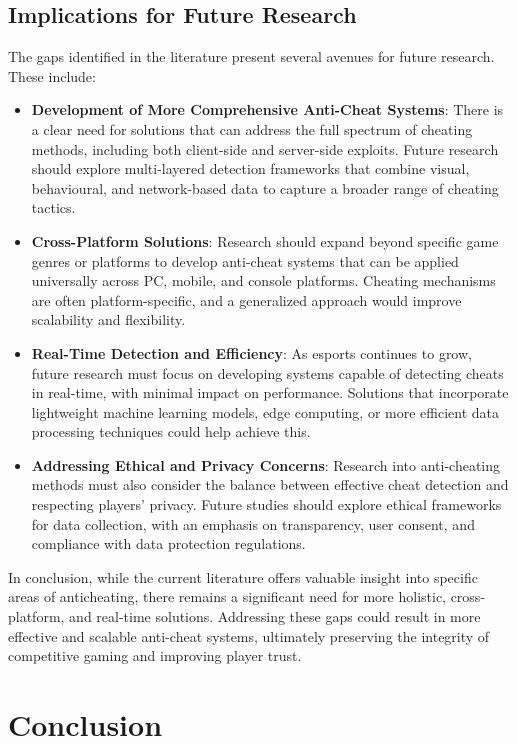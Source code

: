 \documentclass[a4paper, 12pt]{article}
\begin{document}
\subsection{Implications for Future Research}

The gaps identified in the literature present several avenues for future research. These include:

\begin{itemize}
    \item \textbf{Development of More Comprehensive Anti-Cheat Systems}: There is a clear need for solutions that can address the full spectrum of cheating methods, including both client-side and server-side exploits. Future research should explore multi-layered detection frameworks that combine visual, behavioural, and network-based data to capture a broader range of cheating tactics.
    \item \textbf{Cross-Platform Solutions}: Research should expand beyond specific game genres or platforms to develop anti-cheat systems that can be applied universally across PC, mobile, and console platforms. Cheating mechanisms are often platform-specific, and a generalized approach would improve scalability and flexibility.
    \item \textbf{Real-Time Detection and Efficiency}: As esports continues to grow, future research must focus on developing systems capable of detecting cheats in real-time, with minimal impact on performance. Solutions that incorporate lightweight machine learning models, edge computing, or more efficient data processing techniques could help achieve this.
    \item \textbf{Addressing Ethical and Privacy Concerns}: Research into anti-cheating methods must also consider the balance between effective cheat detection and respecting players' privacy. Future studies should explore ethical frameworks for data collection, with an emphasis on transparency, user consent, and compliance with data protection regulations.
\end{itemize}

In conclusion, while the current literature offers valuable insight into specific areas of anticheating, there remains a significant need for more holistic, cross-platform, and real-time solutions. Addressing these gaps could result in more effective and scalable anti-cheat systems, ultimately preserving the integrity of competitive gaming and improving player trust.

\newpage
\section{Conclusion}
\end{document}
